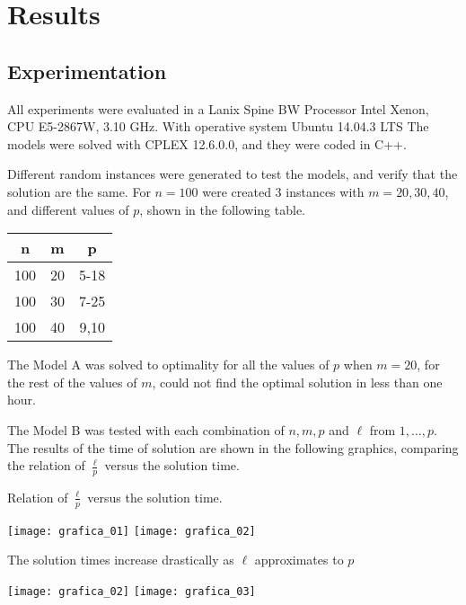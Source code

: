 
\section{Results}
\subsection{Experimentation}
\begin{frame}
  All experiments were evaluated in a Lanix Spine BW
  Processor Intel Xenon, CPU E5-2867W, 3.10 GHz.
  With operative system Ubuntu 14.04.3 LTS
  The models were solved with CPLEX 12.6.0.0,
  and they were coded in C++.
\end{frame}

\begin{frame}
  Different random instances were generated
  to test the models, and verify that the solution are the same.
  For $n = 100$ were created 3 instances with $m = 20,30,40$,
  and different values of $p$, shown in the following table.
  \begin{table}
    \centerign
    \begin{tabular}{|c|c|c|}\hline
      n & m & p \\ \hline
      100 & 20 & 5-18 \\
      100 & 30 & 7-25 \\
      100 & 40 & 9,10 \\
      \hline
    \end{tabular}
  \end{table}
  
  The Model A was solved to optimality for all the values of $p$ when $m = 20$,
  for the rest of the values of $m$, could not find the optimal solution in less than one hour.

  The Model B was tested with each combination of $n,m,p$ and $\ell$ from $1,\ldots,p$.
  The results of the time of solution are shown in the following graphics,
  comparing the relation of $\frac{\ell}{p}$ versus the solution time.

\end{frame}

\begin{frame}
  Relation of $\frac{\ell}{p}$ versus the solution time.
  \begin{center}
    \texttt{[image: grafica\_01]}
    \texttt{[image: grafica\_02]}
  \end{center}
\end{frame}

\begin{frame}

  The solution times increase drastically as $\ell$ approximates to $p$
  
  \begin{center}
    \texttt{[image: grafica\_02]}
    \texttt{[image: grafica\_03]}
  \end{center}
  
\end{frame}

